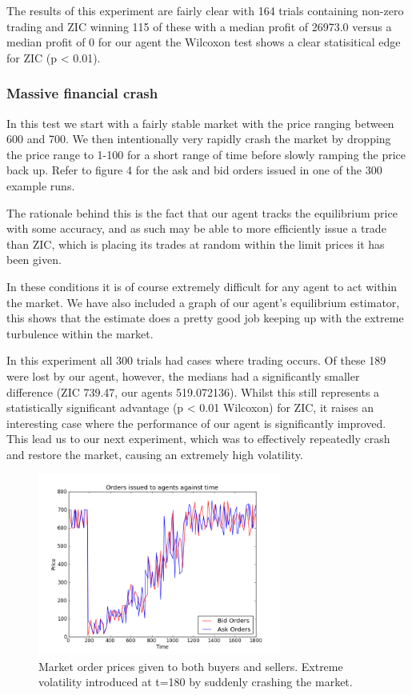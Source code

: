 \documentclass{acm_proc_article-sp}
\begin{document}
The results of this experiment are fairly clear with 164 trials containing
non-zero trading and ZIC winning 115 of these with a median profit of 26973.0
versus a median profit of 0 for our agent the Wilcoxon test shows a clear
statisitical edge for ZIC (p < 0.01).

\subsubsection{Massive financial crash}

In this test we start with a fairly stable market with the price ranging
between 600 and 700. We then intentionally very rapidly crash the market by
dropping the price range to 1-100 for a short range of time before slowly
ramping the price back up.  Refer to figure 4 for the ask and bid orders
issued in one of the 300 example runs.

The rationale behind this is the fact that our agent tracks the equilibrium price
with some accuracy, and as such may be able to more efficiently issue a trade
than ZIC, which is placing its trades at random within the limit prices it has
been given.

In these conditions it is of course extremely difficult for any agent to act
within the market. We have also included a graph of our agent's equilibrium
estimator, this shows that the estimate does a pretty good job keeping up with
the extreme turbulence within the market.

In this experiment all 300 trials had cases where trading occurs. Of these 189
were lost by our agent, however, the medians had a significantly smaller
difference (ZIC 739.47, our agents 519.072136). Whilst this still represents a
statistically significant advantage (p < 0.01 Wilcoxon) for ZIC, it raises an
interesting case where the performance of our agent is significantly improved.
This lead us to our next experiment, which was to effectively repeatedly crash
and restore the market, causing an extremely high volatility.

\begin{figure}[h!] \includegraphics[width=80mm]{crash.png} \caption{Market
order prices given to both buyers and sellers. Extreme volatility introduced at
t=180 by suddenly crashing the market.} \end{figure}
\end{document}
